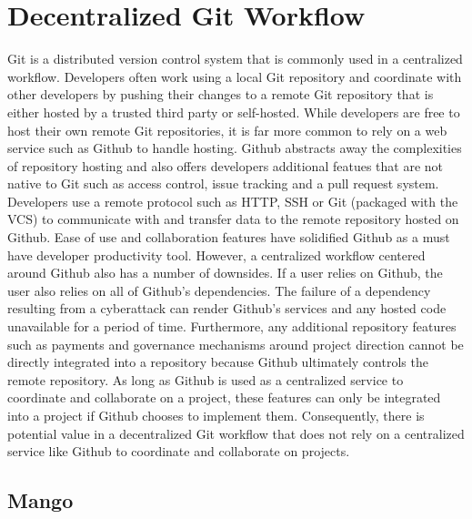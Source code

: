 \section{Decentralized Git Workflow}
\label{sec:git}

Git is a distributed version control system that is commonly used in a
centralized workflow. Developers often work using a local Git repository and
coordinate with other developers by pushing their changes to a remote Git
repository that is either hosted by a trusted third party or self-hosted. While
developers are free to host their own remote Git repositories, it is far more
common to rely on a web service such as Github to handle hosting. Github
abstracts away the complexities of repository hosting and also offers developers
additional featues that are not native to Git such as access control, issue
tracking and a pull request system. Developers use a remote protocol such as
HTTP, SSH or Git (packaged with the VCS) to communicate with and transfer data
to the remote repository hosted on Github\cite{gitprotocol}. Ease of use and collaboration features have
solidified Github as a must have developer productivity tool. However, a
centralized workflow centered around Github also has a number of downsides. If a
user relies on Github, the user also relies on all of Github's dependencies. The
failure of a dependency resulting from a cyberattack can render
Github's services and any hosted code unavailable for a period of
time\cite{dynddos}. Furthermore, any additional repository features such as
payments and governance mechanisms around project direction cannot be directly
integrated into a repository because Github ultimately controls the
remote repository. As long as Github is used as a centralized service to
coordinate and collaborate on a project, these features can only be integrated
into a project if Github chooses to implement them. Consequently, there is
potential value in a decentralized Git workflow that does not rely on a
centralized service like Github to coordinate and collaborate on projects.

\subsection{Mango}

